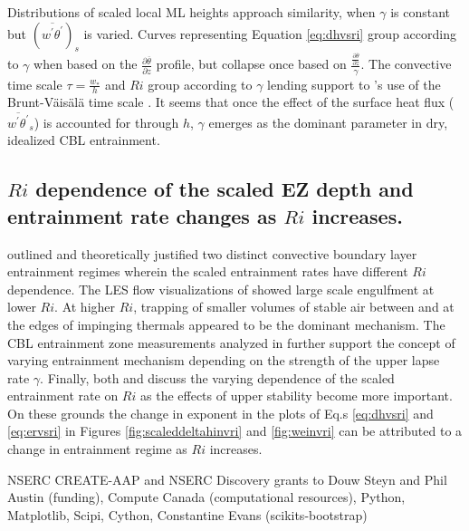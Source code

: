 \documentclass[referee]{svjour3}
\begin{document}
Distributions of scaled local ML heights approach similarity, when $\gamma$ is constant but $(\overline{w^{'}\theta^{'}})_{s}$ is varied.  Curves representing Equation \ref{eq:dhvsri} group according to $\gamma$ when based on the $\frac{\partial \overline{\theta}}{\partial z}$ profile, but collapse once based on $\frac{\frac{\partial \overline{\theta}}{\partial z}}{\gamma}$.  The convective time scale $\tau = \frac{w_{*}}{h}$ and $Ri$ group according to $\gamma$ lending support to \cite{Fedorovich04}'s use of the Brunt-V{\"a}is{\"a}l{\"a} time scale \citep{Nchap14}.  It seems that once the effect of the surface heat flux ($\overline{w^{'}\theta^{'}}_{s}$) is accounted for through $h$, $\gamma$ emerges as the dominant parameter in dry, idealized CBL entrainment.\\
 
\subsection{$Ri$ dependence of the scaled EZ depth and entrainment rate changes as $Ri$ increases.}

\cite{Turner86} outlined and theoretically justified two distinct convective boundary layer entrainment regimes wherein the scaled entrainment rates have different $Ri$ dependence. The LES flow visualizations of \cite{Sullivan98} showed large scale engulfment at lower $Ri$.  At higher $Ri$, trapping of smaller volumes of stable air between and at the edges of impinging thermals appeared to be the dominant mechanism. The CBL entrainment zone measurements analyzed in \cite{Traum11} further support the concept of varying entrainment mechanism depending on the strength of the upper lapse rate $\gamma$.  Finally, both \cite{Fedorovich04} and \cite{Garcia14} discuss the varying dependence of the scaled entrainment rate on $Ri$ as the effects of upper stability become more important.  On these grounds the change in exponent in the plots of Eq.s \ref{eq:dhvsri} and \ref{eq:ervsri} in Figures \ref{fig:scaleddeltahinvri} and \ref{fig:weinvri} can be attributed to a change in entrainment regime as $Ri$ increases.   



\begin{acknowledgements}
NSERC CREATE-AAP and NSERC Discovery grants to Douw Steyn and Phil Austin (funding), Compute Canada (computational resources), Python, Matplotlib, Scipi, Cython, Constantine Evans (scikits-bootstrap) 
\end{acknowledgements}


\end{document}
